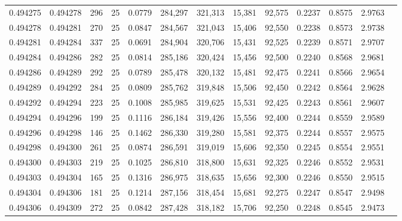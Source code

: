 \begin{tabular}{rrrrrrrrrrrrr}
0.494275 & 0.494278 &   296 &  25 &                                     0.0779 & 284,297 & 321,313 &  15,381 &  92,575 & 0.2237 & 0.8575 & 2.9763 \\
0.494278 & 0.494281 &   270 &  25 &                                     0.0847 & 284,567 & 321,043 &  15,406 &  92,550 & 0.2238 & 0.8573 & 2.9738 \\
0.494281 & 0.494284 &   337 &  25 &                                     0.0691 & 284,904 & 320,706 &  15,431 &  92,525 & 0.2239 & 0.8571 & 2.9707 \\
0.494284 & 0.494286 &   282 &  25 &                                     0.0814 & 285,186 & 320,424 &  15,456 &  92,500 & 0.2240 & 0.8568 & 2.9681 \\
0.494286 & 0.494289 &   292 &  25 &                                     0.0789 & 285,478 & 320,132 &  15,481 &  92,475 & 0.2241 & 0.8566 & 2.9654 \\
0.494289 & 0.494292 &   284 &  25 &                                     0.0809 & 285,762 & 319,848 &  15,506 &  92,450 & 0.2242 & 0.8564 & 2.9628 \\
0.494292 & 0.494294 &   223 &  25 &                                     0.1008 & 285,985 & 319,625 &  15,531 &  92,425 & 0.2243 & 0.8561 & 2.9607 \\
0.494294 & 0.494296 &   199 &  25 &                                     0.1116 & 286,184 & 319,426 &  15,556 &  92,400 & 0.2244 & 0.8559 & 2.9589 \\
0.494296 & 0.494298 &   146 &  25 &                                     0.1462 & 286,330 & 319,280 &  15,581 &  92,375 & 0.2244 & 0.8557 & 2.9575 \\
0.494298 & 0.494300 &   261 &  25 &                                     0.0874 & 286,591 & 319,019 &  15,606 &  92,350 & 0.2245 & 0.8554 & 2.9551 \\
0.494300 & 0.494303 &   219 &  25 &                                     0.1025 & 286,810 & 318,800 &  15,631 &  92,325 & 0.2246 & 0.8552 & 2.9531 \\
0.494303 & 0.494304 &   165 &  25 &                                     0.1316 & 286,975 & 318,635 &  15,656 &  92,300 & 0.2246 & 0.8550 & 2.9515 \\
0.494304 & 0.494306 &   181 &  25 &                                     0.1214 & 287,156 & 318,454 &  15,681 &  92,275 & 0.2247 & 0.8547 & 2.9498 \\
0.494306 & 0.494309 &   272 &  25 &                                     0.0842 & 287,428 & 318,182 &  15,706 &  92,250 & 0.2248 & 0.8545 & 2.9473 \\

\end{tabular}
